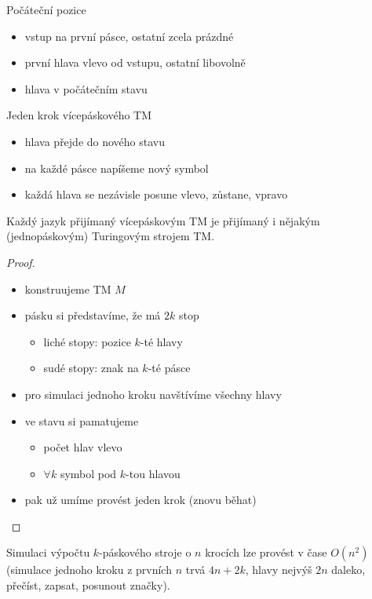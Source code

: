 \documentclass[../main.tex]{subfiles}
\begin{document}
 \begin{definition}
     Počáteční pozice
     \begin{itemize}
         \item vstup na první pásce, ostatní zcela prázdné
         \item první hlava vlevo od vstupu, ostatní libovolně
         \item hlava v počátečním stavu
     \end{itemize}
     Jeden krok vícepáskového TM
     \begin{itemize}
         \item hlava přejde do nového stavu
         \item na každé pásce napíšeme nový symbol
         \item každá hlava se nezávisle posune vlevo, zůstane, vpravo
     \end{itemize}
 \end{definition}
 \begin{theorem}
     Každý jazyk přijímaný vícepáskovým TM je přijímaný i nějakým (jednopáskovým) Turingovým strojem TM.
     \begin{proof}
         \begin{itemize}
             \item konstruujeme TM $M$
             \item pásku si představíme, že má $2k$ stop
             \begin{itemize}
                 \item liché stopy: pozice $k$-té hlavy
                 \item sudé stopy: znak na $k$-té pásce
             \end{itemize}
             \item pro simulaci jednoho kroku navštívíme všechny hlavy
             \item ve stavu si pamatujeme
             \begin{itemize}
                 \item počet hlav vlevo
                 \item $\forall k$ symbol pod $k$-tou hlavou
             \end{itemize}
             \item pak už umíme provést jeden krok (znovu běhat)
         \end{itemize}
     \end{proof}
     Simulaci výpočtu $k$-páskového stroje o $n$ krocích lze provést v čase $O(n^2)$ (simulace jednoho kroku z
     prvních $n$ trvá $4n+2k$, hlavy nejvýš $2n$ daleko, přečíst, zapsat, posunout značky).
 \end{theorem}
\end{document}

